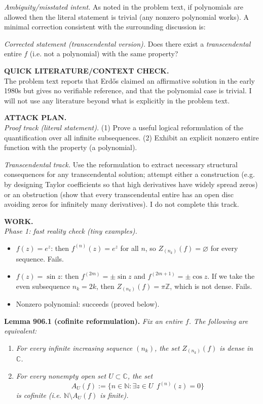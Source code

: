 \medskip
\noindent\emph{Ambiguity/misstated intent.}  As noted in the problem text, if polynomials are allowed then the literal statement is trivial (any nonzero polynomial works). A minimal correction consistent with the surrounding discussion is:

\smallskip
\noindent\emph{Corrected statement (transcendental version).}  Does there exist a \emph{transcendental} entire $f$ (i.e. not a polynomial) with the same property?

\medskip
\noindent\textbf{QUICK LITERATURE/CONTEXT CHECK.}\\
The problem text reports that Erd\H{o}s claimed an affirmative solution in the early 1980s but gives no verifiable reference, and that the polynomial case is trivial. I will not use any literature beyond what is explicitly in the problem text.

\medskip
\noindent\textbf{ATTACK PLAN.}\\
\emph{Proof track (literal statement).}  (1) Prove a useful logical reformulation of the quantification over all infinite subsequences. (2) Exhibit an explicit nonzero entire function with the property (a polynomial).

\smallskip
\noindent\emph{Transcendental track.}  Use the reformulation to extract necessary structural consequences for any transcendental solution; attempt either a construction (e.g. by designing Taylor coefficients so that high derivatives have widely spread zeros) or an obstruction (show that every transcendental entire has an open disc avoiding zeros for infinitely many derivatives). I do not complete this track.

\medskip
\noindent\textbf{WORK.}\\
\emph{Phase 1: fast reality check (tiny examples).}
\begin{itemize}
\item $f(z)=e^z$: then $f^{(n)}(z)=e^z$ for all $n$, so $Z_{(n_k)}(f)=\varnothing$ for every sequence. Fails.
\item $f(z)=\sin z$: then $f^{(2m)}=\pm\sin z$ and $f^{(2m+1)}=\pm\cos z$. If we take the even subsequence $n_k=2k$, then $Z_{(n_k)}(f)=\pi\mathbb{Z}$, which is not dense. Fails.
\item Nonzero polynomial: succeeds (proved below).
\end{itemize}

\medskip
\noindent\textbf{Lemma 906.1 (cofinite reformulation).}  \emph{Fix an entire $f$. The following are equivalent:}
\begin{enumerate}
\item[(A)] \emph{For every infinite increasing sequence $(n_k)$, the set $Z_{(n_k)}(f)$ is dense in $\mathbb{C}$.}
\item[(B)] \emph{For every nonempty open set $U\subset\mathbb{C}$, the set}
\[A_U(f):=\{n\in\mathbb{N}: \exists z\in U\ \ f^{(n)}(z)=0\}\]
\emph{is cofinite (i.e. $\mathbb{N}\setminus A_U(f)$ is finite).}
\end{enumerate}

